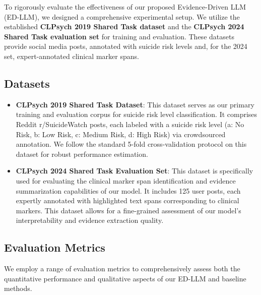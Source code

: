To rigorously evaluate the effectiveness of our proposed Evidence-Driven LLM (ED-LLM), we designed a comprehensive experimental setup. We utilize the established \textbf{CLPsych 2019 Shared Task dataset} and the \textbf{CLPsych 2024 Shared Task evaluation set} for training and evaluation.  These datasets provide social media posts, annotated with suicide risk levels and, for the 2024 set, expert-annotated clinical marker spans.

\subsection{Datasets}

\begin{itemize}
    \item \textbf{CLPsych 2019 Shared Task Dataset}: This dataset serves as our primary training and evaluation corpus for suicide risk level classification. It comprises Reddit r/SuicideWatch posts, each labeled with a suicide risk level (a: No Risk, b: Low Risk, c: Medium Risk, d: High Risk) via crowdsourced annotation. We follow the standard 5-fold cross-validation protocol on this dataset for robust performance estimation.
    \item \textbf{CLPsych 2024 Shared Task Evaluation Set}: This dataset is specifically used for evaluating the clinical marker span identification and evidence summarization capabilities of our model. It includes 125 user posts, each expertly annotated with highlighted text spans corresponding to clinical markers. This dataset allows for a fine-grained assessment of our model's interpretability and evidence extraction quality.
\end{itemize}

\subsection{Evaluation Metrics}

We employ a range of evaluation metrics to comprehensively assess both the quantitative performance and qualitative aspects of our ED-LLM and baseline methods.


